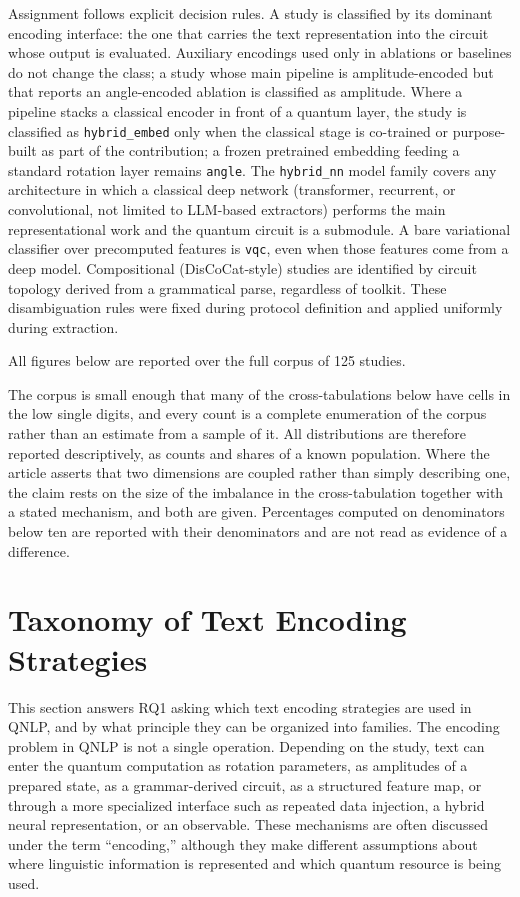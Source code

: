 \documentclass{ieeeaccess}
\begin{document}
Assignment follows explicit decision rules. A study is classified by its
dominant encoding interface: the one that carries the text representation into
the circuit whose output is evaluated. Auxiliary encodings used only in
ablations or baselines do not change the class; a study whose main pipeline is
amplitude-encoded but that reports an angle-encoded ablation is classified as
amplitude. Where a pipeline stacks a classical encoder in front of a quantum
layer, the study is classified as \texttt{hybrid\_embed} only when the
classical stage is co-trained or purpose-built as part of the contribution; a
frozen pretrained embedding feeding a standard rotation layer remains
\texttt{angle}. The \texttt{hybrid\_nn} model family covers any architecture in
which a classical deep network (transformer, recurrent, or convolutional, not
limited to LLM-based extractors) performs the main representational work and
the quantum circuit is a submodule. A bare variational classifier over
precomputed features is \texttt{vqc}, even when those features come from a deep
model. Compositional (DisCoCat-style) studies are identified by circuit
topology derived from a grammatical parse, regardless of toolkit. These
disambiguation rules were fixed during protocol definition and applied
uniformly during extraction.

All figures below are reported over the full corpus of 125 studies.

The corpus is small enough that many of the cross-tabulations below have cells
in the low single digits, and every count is a complete enumeration of the
corpus rather than an estimate from a sample of it. All distributions are
therefore reported descriptively, as counts and shares of a known population.
Where the article asserts that two dimensions are coupled rather than simply
describing one, the claim rests on the size of the imbalance in the
cross-tabulation together with a stated mechanism, and both are given.
Percentages computed on denominators below ten are reported with their
denominators and are not read as evidence of a difference.

\section{Taxonomy of Text Encoding Strategies}
\label{sec:taxonomy}

This section answers RQ1 asking which text encoding strategies are used in QNLP, and by what principle they can be organized into families. The encoding problem in QNLP is not a single operation. Depending on the study, text can enter the quantum computation as rotation parameters, as amplitudes of a prepared state, as a grammar-derived circuit, as a structured feature map, or through a more specialized interface such as repeated data injection, a hybrid neural representation, or an observable. These mechanisms are often discussed under the term ``encoding,'' although they make different assumptions about where linguistic information is represented and which quantum resource is being used.
\end{document}
